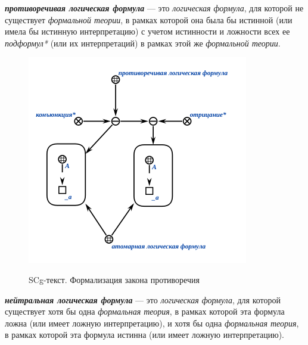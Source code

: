 \begin{SCn}
\end{SCn}
\textbf{\textit{противоречивая логическая формула}} --- это \textit{логическая формула}, для которой не существует \textit{формальной теории}, в рамках которой она была бы истинной (или имела бы истинную интерпретацию) с учетом истинности и ложности всех ее \textit{подформул*} (или их интерпретаций) в рамках этой же \textit{формальной теории}.

\begin{figure}[H]
	\caption{SCg-текст. Формализация закона противоречия}
	\includegraphics[scale=0.8]{author/part2/figures/logic/contradiction_formula.png}
	\label{fig:contradiction_formula}
\end{figure}

\begin{SCn}
\end{SCn}

\textbf{\textit{нейтральная логическая формула}} --- это \textit{логическая формула}, для которой существует хотя бы одна \textit{формальная теория}, в рамках которой эта формула ложна (или имеет ложную интерпретацию), и хотя бы одна \textit{формальная теория}, в рамках которой эта формула истинна (или имеет ложную интерпретацию).

